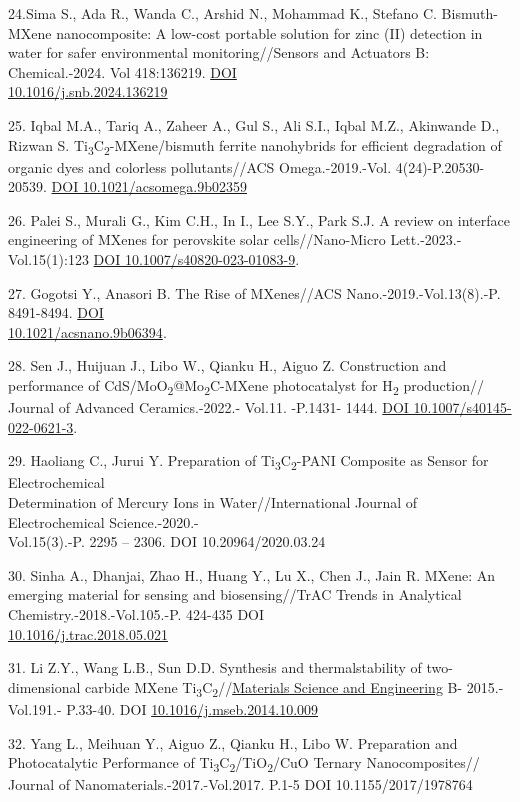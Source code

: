\begin{references}
24.Sima S., Ada R., Wanda C., Arshid N., Mohammad K., Stefano C.
Bismuth-MXene nanocomposite: A low-cost portable solution for
zinc (II) detection in water for safer environmental
monitoring//Sensors and Actuators B: Chemical.-2024. Vol
418:136219.
\href{https://doi.org/10.1016/j.snb.2024.136219}{DOI\\
10.1016/j.snb.2024.136219}

25. Iqbal M.A., Tariq A., Zaheer A., Gul S., Ali S.I., Iqbal
M.Z., Akinwande D., Rizwan S.
Ti\textsubscript{3}C\textsubscript{2}-MXene/bismuth ferrite
nanohybrids for efficient degradation of organic dyes and
colorless pollutants//ACS Omega.-2019.-Vol. 4(24)-P.20530-20539.
\href{https://doi.org/10.1021/acsomega.9b02359}{DOI
10.1021/acsomega.9b02359}

26. Palei S., Murali G., Kim C.H., In I., Lee S.Y., Park S.J. A
review on interface engineering of MXenes for perovskite solar
cells//Nano-Micro Lett.-2023.-Vol.15(1):123
\href{https://doi.org/10.1007/s40820-023-01083-9}{DOI
10.1007/s40820-023-01083-9}.

27. Gogotsi Y., Anasori B. The Rise of MXenes//ACS
Nano.-2019.-Vol.13(8).-P. 8491-8494.
\href{https://doi.org/10.1021/acsnano.9b06394}{DOI\\
10.1021/acsnano.9b06394}.

28. Sen J., Huijuan J., Libo W., Qianku H., Aiguo Z. Construction
and performance of
CdS/MoO\textsubscript{2}@Mo\textsubscript{2}C-MXene photocatalyst
for H\textsubscript{2} production// Journal of Advanced
Ceramics.-2022.- Vol.11. -P.1431- 1444.
\href{https://doi.org/10.1007/s40145-022-0621-3}{DOI
10.1007/s40145-022-0621-3}.

29. Haoliang C., Jurui Y. Preparation of
Ti\textsubscript{3}C\textsubscript{2}-PANI Composite as Sensor for
Electrochemical \\Determination of Mercury Ions in
Water//International Journal of Electrochemical Science.-2020.-\\
Vol.15(3).-P. 2295 -- 2306. DOI 10.20964/2020.03.24

30. Sinha A., Dhanjai, Zhao H., Huang Y., Lu X., Chen J., Jain R.
MXene: An emerging material for sensing and biosensing//TrAC
Trends in Analytical Chemistry.-2018.-Vol.105.-P. 424-435 DOI\\
\href{http://dx.doi.org/10.1016/j.trac.2018.05.021}{10.1016/j.trac.2018.05.021}

31. Li Z.Y., Wang L.B., Sun D.D. Synthesis and thermalstability
of two-dimensional carbide MXene
Ti\textsubscript{3}C\textsubscript{2}//\href{https://www.researchgate.net/journal/Materials-Science-and-Engineering-B-0921-5107?_tp=eyJjb250ZXh0Ijp7ImZpcnN0UGFnZSI6InB1YmxpY2F0aW9uIiwicGFnZSI6InB1YmxpY2F0aW9uIn19}{Materials
Science and Engineering} B- 2015.-Vol.191.- P.33-40.
DOI \href{http://dx.doi.org/10.1016/j.mseb.2014.10.009}{10.1016/j.mseb.2014.10.009}

32. Yang L., Meihuan Y., Aiguo Z., Qianku H., Libo W.
Preparation and Photocatalytic Performance of
Ti\textsubscript{3}C\textsubscript{2}/TiO\textsubscript{2}/CuO
Ternary Nanocomposites// Journal of Nanomaterials.-2017.-Vol.2017.
P.1-5 DOI 10.1155/2017/1978764
\end{references}

